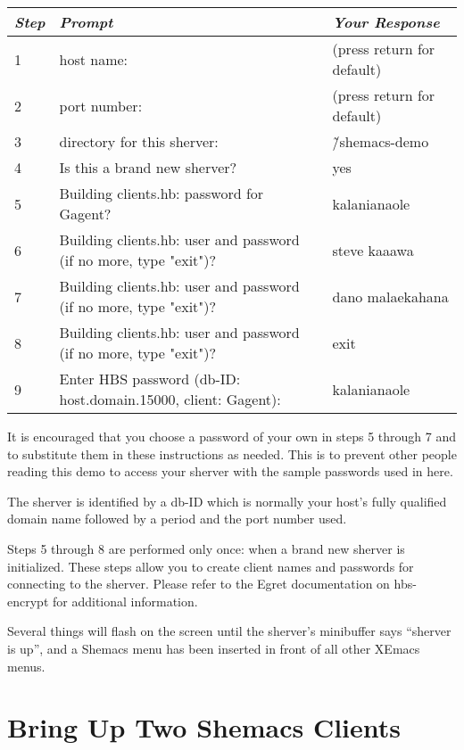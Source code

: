 \small
\begin{center}
\begin{tabular} {|l|l|l|} \hline
{\em Step} & {\em Prompt}  & {\em Your Response} \\ \hline
1 & host name: & (press return for default) \\
2 & port number: & (press return for default) \\
3 & directory for this sherver: & \~ /shemacs-demo \\
4 & Is this a brand new sherver? & yes \\
5 & Building clients.hb: password for Gagent?  & kalanianaole \\
6 & Building clients.hb: user and password (if no more, type "exit")? &
steve kaaawa \\
7 & Building clients.hb: user and password (if no more, type "exit")? &
dano malaekahana \\
8 & Building clients.hb: user and password (if no more, type "exit")? &
exit \\
9 & Enter HBS password (db-ID: host.domain.15000, client: Gagent): &
kalanianaole \\
\hline
\end{tabular}
\end{center}
\normalsize

It is encouraged that you choose a password of your own in steps 5 through
7 and to substitute them in these instructions as needed. This is to
prevent other people reading this demo to access your sherver with the
sample passwords used in here.

The sherver is identified by a db-ID which is normally your host's fully
qualified domain name followed by a period and the port number used.

Steps 5 through 8 are performed only once: when a brand new sherver is
initialized.  These steps allow you to create client names and passwords
for connecting to the sherver.  Please refer to the Egret documentation on
hbs-encrypt for additional information.

Several things will flash on the screen until the sherver's minibuffer says
``sherver is up'', and a Shemacs menu has been inserted in front of all other
XEmacs menus.

\section{Bring Up Two Shemacs Clients}

